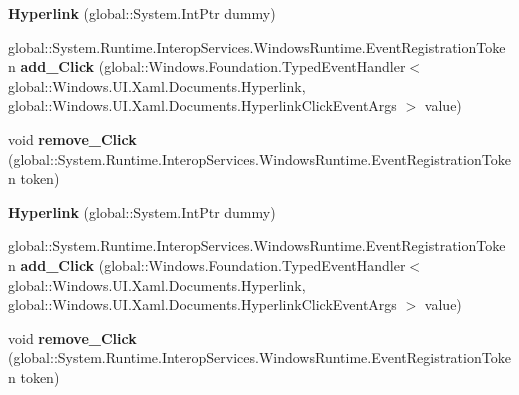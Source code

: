 \begin{DoxyCompactItemize}
\mbox{\label{class_windows_1_1_u_i_1_1_xaml_1_1_documents_1_1_hyperlink_a08712572a1cb4eedfbd6f7cd2c4acc27}} 
{\bfseries Hyperlink} (global\+::\+System.\+Int\+Ptr dummy)
\item 
\mbox{\label{class_windows_1_1_u_i_1_1_xaml_1_1_documents_1_1_hyperlink_affeaa11b3385e3c202507e52f89e8e9c}} 
global\+::\+System.\+Runtime.\+Interop\+Services.\+Windows\+Runtime.\+Event\+Registration\+Token {\bfseries add\+\_\+\+Click} (global\+::\+Windows.\+Foundation.\+Typed\+Event\+Handler$<$ global\+::\+Windows.\+U\+I.\+Xaml.\+Documents.\+Hyperlink, global\+::\+Windows.\+U\+I.\+Xaml.\+Documents.\+Hyperlink\+Click\+Event\+Args $>$ value)
\item 
\mbox{\label{class_windows_1_1_u_i_1_1_xaml_1_1_documents_1_1_hyperlink_af58bad7f30cb13f3d129ef81adcd34cb}} 
void {\bfseries remove\+\_\+\+Click} (global\+::\+System.\+Runtime.\+Interop\+Services.\+Windows\+Runtime.\+Event\+Registration\+Token token)
\item 
\mbox{\label{class_windows_1_1_u_i_1_1_xaml_1_1_documents_1_1_hyperlink_a08712572a1cb4eedfbd6f7cd2c4acc27}} 
{\bfseries Hyperlink} (global\+::\+System.\+Int\+Ptr dummy)
\item 
\mbox{\label{class_windows_1_1_u_i_1_1_xaml_1_1_documents_1_1_hyperlink_affeaa11b3385e3c202507e52f89e8e9c}} 
global\+::\+System.\+Runtime.\+Interop\+Services.\+Windows\+Runtime.\+Event\+Registration\+Token {\bfseries add\+\_\+\+Click} (global\+::\+Windows.\+Foundation.\+Typed\+Event\+Handler$<$ global\+::\+Windows.\+U\+I.\+Xaml.\+Documents.\+Hyperlink, global\+::\+Windows.\+U\+I.\+Xaml.\+Documents.\+Hyperlink\+Click\+Event\+Args $>$ value)
\item 
\mbox{\label{class_windows_1_1_u_i_1_1_xaml_1_1_documents_1_1_hyperlink_af58bad7f30cb13f3d129ef81adcd34cb}} 
void {\bfseries remove\+\_\+\+Click} (global\+::\+System.\+Runtime.\+Interop\+Services.\+Windows\+Runtime.\+Event\+Registration\+Token token)
\item 

\end{DoxyCompactItemize}
